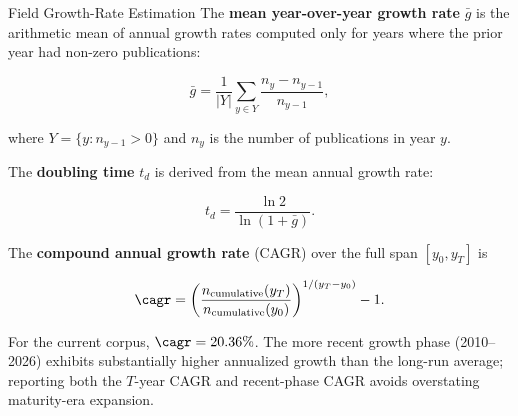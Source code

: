 \documentclass[
  ignorenonframetext,
]{beamer}
\begin{document}
\begin{frame}[allowframebreaks]{Field Growth-Rate Estimation
\label{sec:appendix_growth}}
\protect{}\label{field-growth-rate-estimation}
The \textbf{mean year-over-year growth rate} \(\bar{g}\) is the
arithmetic mean of annual growth rates computed only for years where the
prior year had non-zero publications:

\begin{equation}
\bar{g} = \frac{1}{|Y|} \sum_{y \in Y} \frac{n_y - n_{y-1}}{n_{y-1}}, \label{eq:mean_growth}
\end{equation}

where \(Y = \{y : n_{y-1} > 0\}\) and \(n_y\) is the number of
publications in year \(y\).

The \textbf{doubling time} \(t_d\) is derived from the mean annual
growth rate:

\begin{equation}
t_d = \frac{\ln 2}{\ln(1 + \bar{g})}. \label{eq:doubling_time}
\end{equation}

The \textbf{compound annual growth rate} (CAGR) over the full span
\([y_0, y_T]\) is

\begin{equation}
\cagr = \left(\frac{n_{\text{cumulative}}(y_T)}{n_{\text{cumulative}}(y_0)}\right)^{1/(y_T - y_0)} - 1. \label{eq:cagr}
\end{equation}

For the current corpus, \(\cagr = 20.36\%\). The more recent growth
phase (2010--2026) exhibits substantially higher annualized growth than
the long-run average; reporting both the \(T\)-year CAGR and
recent-phase CAGR avoids overstating maturity-era expansion.

\FloatBarrier
\end{frame}
\end{document}
